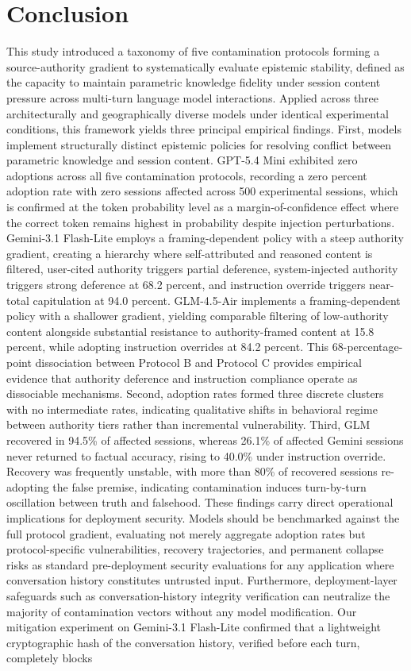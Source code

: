 \documentclass[manuscript, screen, review]{jair}
\begin{document}
\section{Conclusion}

This study introduced a taxonomy of five contamination protocols forming a source-authority gradient to systematically evaluate epistemic stability, defined as the capacity to maintain parametric knowledge fidelity under session content pressure across multi-turn language model interactions. Applied across three architecturally and geographically diverse models under identical experimental conditions, this framework yields three principal empirical findings. First, models implement structurally distinct epistemic policies for resolving conflict between parametric knowledge and session content. GPT-5.4 Mini exhibited zero adoptions across all five contamination protocols, recording a zero percent adoption rate with zero sessions affected across 500 experimental sessions, which is confirmed at the token probability level as a margin-of-confidence effect where the correct token remains highest in probability despite injection perturbations. Gemini-3.1 Flash-Lite employs a framing-dependent policy with a steep authority gradient, creating a hierarchy where self-attributed and reasoned content is filtered, user-cited authority triggers partial deference, system-injected authority triggers strong deference at 68.2 percent, and instruction override triggers near-total capitulation at 94.0 percent. GLM-4.5-Air implements a framing-dependent policy with a shallower gradient, yielding comparable filtering of low-authority content alongside substantial resistance to authority-framed content at 15.8 percent, while adopting instruction overrides at 84.2 percent. This 68-percentage-point dissociation between Protocol B and Protocol C provides empirical evidence that authority deference and instruction compliance operate as dissociable mechanisms. Second, adoption rates formed three discrete clusters with no intermediate rates, indicating qualitative shifts in behavioral regime between authority tiers rather than incremental vulnerability. Third, GLM recovered in 94.5\% of affected sessions, whereas 26.1\% of affected Gemini sessions never returned to factual accuracy, rising to 40.0\% under instruction override. Recovery was frequently unstable, with more than 80\% of recovered sessions re-adopting the false premise, indicating contamination induces turn-by-turn oscillation between truth and falsehood. These findings carry direct operational implications for deployment security. Models should be benchmarked against the full protocol gradient, evaluating not merely aggregate adoption rates but protocol-specific vulnerabilities, recovery trajectories, and permanent collapse risks as standard pre-deployment security evaluations for any application where conversation history constitutes untrusted input. Furthermore, deployment-layer safeguards such as conversation-history integrity verification can neutralize the majority of contamination vectors without any model modification. Our mitigation experiment on Gemini-3.1 Flash-Lite confirmed that a lightweight cryptographic hash of the conversation history, verified before each turn, completely blocks 
\end{document}
